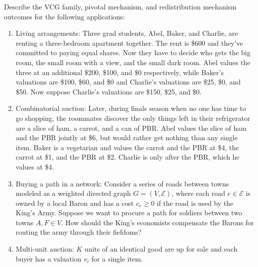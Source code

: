 \documentclass[10pt]{article}
\begin{document}
\begin{spacing}{1.0}
\begin{exercise}
  Describe the VCG family, pivotal mechanism, and redistribution mechanism
  outcomes for the following applications:
  \begin{enumerate}
  \item Living arrangements: Three grad students, Abel, Baker, and Charlie,
    are renting a three-bedroom apartment together. The rent is \$600 and
    they've committed to paying equal shares. Now they have to decide who
    gets the big room, the small room with a view, and the small dark
    room. Abel values the three at an additional \$200, \$100, and \$0
    respectively, while Baker's valuations are \$100, \$60, and \$0 and Charlie's
    valuations are \$25, \$0, and \$50. Now suppose Charlie's valuations
    are \$150, \$25, and \$0.
  \item Combinatorial auction: Later, during finals season when no one has
    time to go shopping, the roommates discover the only things left in
    their refrigerator are a slice of ham, a carrot, and a can of PBR. Abel
    values the slice of ham and the PBR jointly at \$6, but would rather
    get nothing than any single item. Baker is a vegetarian and values the
    carrot and the PBR at \$4, the carrot at \$1, and the PBR at
    \$2. Charlie is only after the PBR, which he values at \$4.
  \item Buying a path in a network: Consider a series of roads between
    towns modeled as a weighted directed graph $G=(V,\mathcal{E})$, where each road
    $e\in \mathcal{E}$ is owned by a local Baron and has a cost $c_e \geq 0$ if the
    road is used by the King's Army. Suppose we want to procure a path for
    soldiers between two towns $A,F \in V$. How should the King's
    economists compensate the Barons for routing the army through their
    fiefdoms?
    \begin{center}
    \end{center}

  \item Multi-unit auction: $K$ units of an identical good are up for sale
    and each buyer has a valuation $v_i$ for a single item.
  \end{enumerate}
\end{exercise}

\end{spacing}
\end{document}
